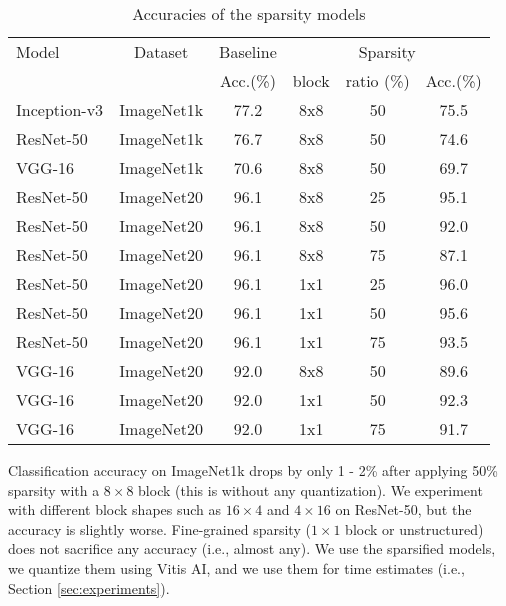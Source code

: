 \documentclass[sigconf]{acmart}
\begin{document}
\begin{table}[ht]
\caption{Accuracies of the sparsity models}
\label{tab_acc}
\begin{center} 
\scalebox{0.9}
{
\begin{tabular}{|l|c|c|c|c|c|}
\hline
\rule[-1ex]{0pt}{3.5ex}  Model & Dataset & Baseline  & \multicolumn{3}{c|}{Sparsity}\\
\rule[-1ex]{0pt}{3.5ex}  {} & {} & Acc.(\%) & block & ratio (\%) & Acc.(\%)    \\\hline\hline
\rule[-1ex]{0pt}{3.5ex}  Inception-v3 & ImageNet1k & 77.2 & 8x8 & 50 & 75.5  \\\hline
\rule[-1ex]{0pt}{3.5ex}  ResNet-50 & ImageNet1k & 76.7 & 8x8 & 50 & 74.6  \\\hline
\rule[-1ex]{0pt}{3.5ex}  VGG-16    & ImageNet1k & 70.6 & 8x8 & 50 & 69.7  \\\hline \hline
\rule[-1ex]{0pt}{3.5ex}  ResNet-50 & ImageNet20 & 96.1 & 8x8 & 25 & 95.1  \\\hline
\rule[-1ex]{0pt}{3.5ex}  ResNet-50 & ImageNet20 & 96.1 & 8x8 & 50 & 92.0  \\\hline
\rule[-1ex]{0pt}{3.5ex}  ResNet-50 & ImageNet20 & 96.1 & 8x8 & 75 & 87.1  \\\hline
\rule[-1ex]{0pt}{3.5ex}  ResNet-50 & ImageNet20 & 96.1 & 1x1 & 25 & 96.0  \\\hline
\rule[-1ex]{0pt}{3.5ex}  ResNet-50 & ImageNet20 & 96.1 & 1x1 & 50 & 95.6  \\\hline
\rule[-1ex]{0pt}{3.5ex}  ResNet-50 & ImageNet20 & 96.1 & 1x1 & 75 & 93.5  \\\hline
\rule[-1ex]{0pt}{3.5ex}  VGG-16    & ImageNet20 & 92.0 & 8x8 & 50 & 89.6  \\\hline
\rule[-1ex]{0pt}{3.5ex}  VGG-16    & ImageNet20 & 92.0 & 1x1 & 50 & 92.3  \\\hline
\rule[-1ex]{0pt}{3.5ex}  VGG-16    & ImageNet20 & 92.0 & 1x1 & 75 & 91.7  \\\hline
\end{tabular}\vspace{-20pt}
}
\end{center}
\end{table}

Classification accuracy on ImageNet1k drops by only 1 - 2\% after
applying 50\% sparsity with a $8\times 8$ block (this is without any
quantization). We experiment with different block shapes such as
$16\times 4$ and $4\times 16$ on ResNet-50, but the accuracy is
slightly worse. Fine-grained sparsity ($1\times 1$ block or
unstructured) does not sacrifice any accuracy (i.e., almost any).  We
use the sparsified models, we quantize them using Vitis AI, and we use
them for time estimates (i.e., Section \ref{sec:experiments}).
\end{document}
